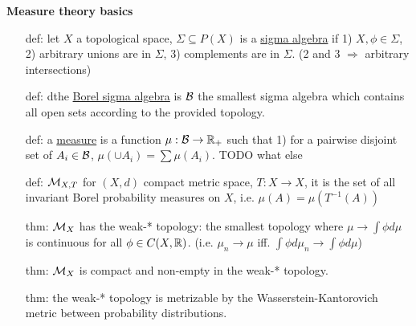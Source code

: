 \documentclass[11pt, reqno]{amsart}
\theoremstyle{plain}
\numberwithin{thm}{subsection}
\theoremstyle{definition}
\begin{document}
{\begin{multicols}{2}
\textbf{Measure theory basics}
\begin{itemize}[leftmargin=2.3em]
  \item[def:] let $X$ a topological space, $\Sigma \subseteq P(X)$ is a \underline{sigma algebra} if 1) $X, \phi \in \Sigma$, 2) arbitrary unions are in $\Sigma$, 3) complements are in $\Sigma$. (2 and 3 $\Rightarrow$ arbitrary intersections)
  \item[def:] dthe \underline{Borel sigma algebra} is $\mathcal{B}$ the smallest sigma algebra which contains all open sets according to the provided topology. 
  \item[def:] a \underline{measure} is a function $\mu: \mathcal{B} \rightarrow \mathbb{R}_+$ such that 1) for a pairwise disjoint set of $A_i \in \mathcal{B}$, $\mu(\cup A_i) = \sum \mu (A_i)$. TODO what else 
  \item[def:] \underline{$\mathcal{M}_{X,T}$} for $(X,d)$ compact metric space, $T: X \rightarrow X$, it is the set of all invariant Borel probability measures on $X$, i.e. $\mu(A) = \mu(T^{-1}(A))$
  \item[thm:] $\mathcal{M}_X$ has the weak-* topology: the smallest topology where $\mu \rightarrow \int \phi d\mu$ is continuous for all $\phi \in C(X, \mathbb{R})$. (i.e. $\mu_n \rightarrow \mu$ iff. $\int \phi d\mu_n \rightarrow \int \phi d\mu$)
  \item[thm:] $\mathcal{M}_X$ is compact and non-empty in the weak-* topology. 
  \item[thm:] the weak-* topology is metrizable by the Wasserstein-Kantorovich metric between probability distributions. 
\end{itemize}


\end{multicols}}
\end{document}
